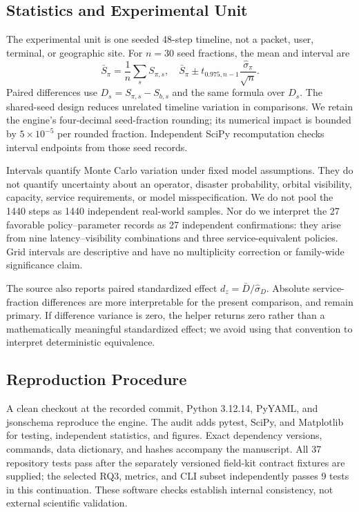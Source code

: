 \documentclass[10pt,twocolumn]{article}
\begin{document}
\subsection{Statistics and Experimental Unit}
The experimental unit is one seeded 48-step timeline, not a packet, user, terminal, or geographic site. For $n=30$ seed fractions, the mean and interval are
\begin{equation}
 \bar S_\pi=\frac1n\sum_s S_{\pi,s},\quad
 \bar S_\pi\pm t_{0.975,n-1}\frac{\hat\sigma_\pi}{\sqrt n}.
\end{equation}
Paired differences use $D_s=S_{\pi,s}-S_{b,s}$ and the same formula over $D_s$. The shared-seed design reduces unrelated timeline variation in comparisons. We retain the engine's four-decimal seed-fraction rounding; its numerical impact is bounded by $5\times10^{-5}$ per rounded fraction. Independent SciPy recomputation checks interval endpoints from those seed records.

Intervals quantify Monte Carlo variation under fixed model assumptions. They do not quantify uncertainty about an operator, disaster probability, orbital visibility, capacity, service requirements, or model misspecification. We do not pool the 1440 steps as 1440 independent real-world samples. Nor do we interpret the 27 favorable policy--parameter records as 27 independent confirmations: they arise from nine latency--visibility combinations and three service-equivalent policies. Grid intervals are descriptive and have no multiplicity correction or family-wide significance claim.

The source also reports paired standardized effect $d_z=\bar D/\hat\sigma_D$. Absolute service-fraction differences are more interpretable for the present comparison, and remain primary. If difference variance is zero, the helper returns zero rather than a mathematically meaningful standardized effect; we avoid using that convention to interpret deterministic equivalence.

\subsection{Reproduction Procedure}
A clean checkout at the recorded commit, Python 3.12.14, PyYAML, and jsonschema reproduce the engine. The audit adds pytest, SciPy, and Matplotlib for testing, independent statistics, and figures. Exact dependency versions, commands, data dictionary, and hashes accompany the manuscript. All 37 repository tests pass after the separately versioned field-kit contract fixtures are supplied; the selected RQ3, metrics, and CLI subset independently passes 9 tests in this continuation. These software checks establish internal consistency, not external scientific validation.
\end{document}
